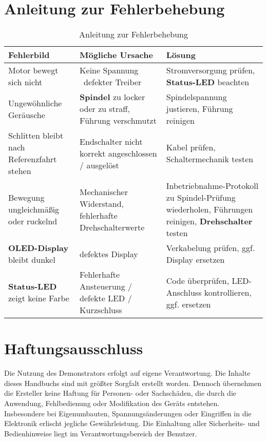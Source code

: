 \documentclass[a4paper,12pt]{report}
\begin{document}
	
	
	\chapter{Anleitung zur Fehlerbehebung}
	\begin{table}[h]
		\centering
		\begin{tabular}{|p{4cm}|p{5cm}|p{4cm}|}
			\hline
			\textbf{Fehlerbild} & \textbf{Mögliche Ursache} & \textbf{Lösung} \\ \hline
			Motor bewegt sich nicht & Keine Spannung \ defekter Treiber & Stromversorgung prüfen, \textbf{Status-LED} beachten \\ \hline
			Ungewöhnliche Geräusche & \textbf{Spindel} zu locker oder zu straff, Führung verschmutzt & Spindelspannung justieren, Führung reinigen \\ \hline
			Schlitten bleibt nach Referenzfahrt stehen & Endschalter nicht korrekt angeschlossen / ausgelöst & Kabel prüfen, Schaltermechanik testen \\ \hline
			Bewegung ungleichmäßig oder ruckelnd & Mechanischer Widerstand, fehlerhafte Drehschalterwerte & Inbetriebnahme-Protokoll zu Spindel-Prüfung wiederholen, Führungen reinigen, \textbf{Drehschalter} testen \\ \hline
			\textbf{OLED-Display} bleibt dunkel & defektes Display & Verkabelung prüfen, ggf. Display ersetzen \\ \hline
			\textbf{Status-LED} zeigt keine Farbe & Fehlerhafte Ansteuerung / defekte LED / Kurzschluss & Code überprüfen, LED-Anschluss kontrollieren, ggf. ersetzen \\ \hline
		\end{tabular}
		\caption{Anleitung zur Fehlerbehebung}
		\label{tab:fehlerbehebung}
	\end{table}
	
	
	\chapter{Haftungsausschluss}

		Die Nutzung des Demonstrators erfolgt auf eigene Verantwortung. Die Inhalte dieses Handbuchs sind mit größter Sorgfalt erstellt worden. Dennoch übernehmen die Ersteller keine Haftung für Personen- oder Sachschäden, die durch die Anwendung, Fehlbedienung oder Modifikation des Geräts entstehen. \\
		
		Insbesondere bei Eigenumbauten, Spannungsänderungen oder Eingriffen in die Elektronik erlischt jegliche Gewährleistung. Die Einhaltung aller Sicherheits- und Bedienhinweise liegt im Verantwortungsbereich der Benutzer. 
\end{document}
